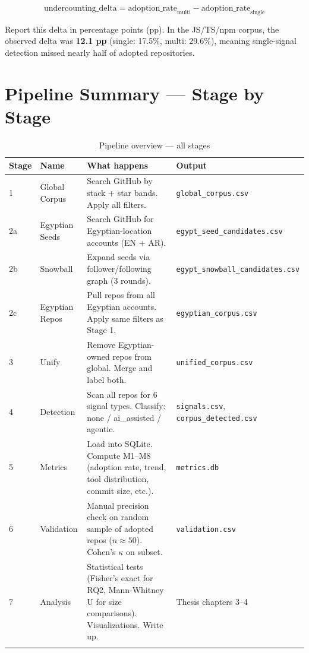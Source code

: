 \documentclass[11pt,a4paper]{article}
\begin{document}
\[
\text{undercounting\_delta} = \text{adoption\_rate}_{\text{multi}} - \text{adoption\_rate}_{\text{single}}
\]

Report this delta in percentage points (pp). In the JS/TS/npm corpus, the observed delta was \textbf{12.1 pp} (single: 17.5\%, multi: 29.6\%), meaning single-signal detection missed nearly half of adopted repositories.

\section{Pipeline Summary — Stage by Stage}

\begin{longtable}{lp{3.5cm}p{5cm}p{4cm}}
\toprule
\textbf{Stage} & \textbf{Name} & \textbf{What happens} & \textbf{Output} \\
\midrule
\endhead
1 & Global Corpus & Search GitHub by stack + star bands. Apply all filters. & \texttt{global\_corpus.csv} \\
\midrule
2a & Egyptian Seeds & Search GitHub for Egyptian-location accounts (EN + AR). & \texttt{egypt\_seed\_candidates.csv} \\
\midrule
2b & Snowball & Expand seeds via follower/following graph (3 rounds). & \texttt{egypt\_snowball\_candidates.csv} \\
\midrule
2c & Egyptian Repos & Pull repos from all Egyptian accounts. Apply same filters as Stage 1. & \texttt{egyptian\_corpus.csv} \\
\midrule
3 & Unify & Remove Egyptian-owned repos from global. Merge and label both. & \texttt{unified\_corpus.csv} \\
\midrule
4 & Detection & Scan all repos for 6 signal types. Classify: none / ai\_assisted / agentic. & \texttt{signals.csv}, \texttt{corpus\_detected.csv} \\
\midrule
5 & Metrics & Load into SQLite. Compute M1--M8 (adoption rate, trend, tool distribution, commit size, etc.). & \texttt{metrics.db} \\
\midrule
6 & Validation & Manual precision check on random sample of adopted repos ($n \approx 50$). Cohen's $\kappa$ on subset. & \texttt{validation.csv} \\
\midrule
7 & Analysis & Statistical tests (Fisher's exact for RQ2, Mann-Whitney U for size comparisons). Visualizations. Write up. & Thesis chapters 3--4 \\
\bottomrule
\caption{Pipeline overview — all stages}
\end{longtable}
\end{document}
